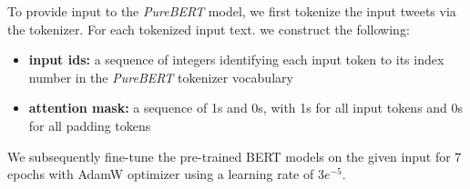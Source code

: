 \documentclass[11pt,a4paper]{article}
\begin{document}
\newline
To provide input to the \textit{PureBERT} model, we first tokenize the input tweets via the tokenizer. For each tokenized input text.  we construct the following:
\begin{itemize}[noitemsep,topsep=2pt,parsep=0pt,partopsep=0pt]
    \item \textbf{input ids:} a sequence of integers identifying each input token to its index number in the \textit{PureBERT} tokenizer vocabulary
    \item \textbf{attention mask:} a sequence of 1s and 0s, with 1s for all input tokens and 0s for all padding tokens
\end{itemize}
We subsequently fine-tune the pre-trained BERT models on the given input for $7$ epochs with AdamW optimizer \citep{RN687} using a learning rate of $3e^{-5}$.
\end{document}
